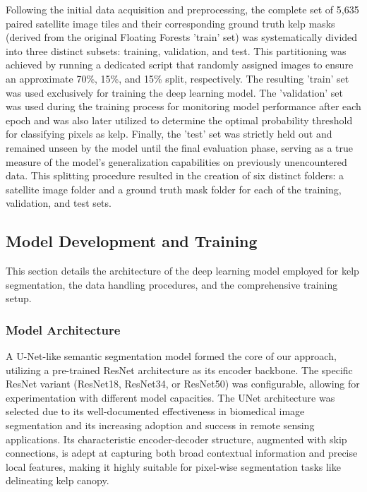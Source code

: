 \documentclass{article}
\begin{document}
Following the initial data acquisition and preprocessing, the complete set of 5,635 paired satellite image tiles and their corresponding ground truth kelp masks (derived from the original Floating Forests 'train' set) was systematically divided into three distinct subsets: training, validation, and test. This partitioning was achieved by running a dedicated script that randomly assigned images to ensure an approximate 70\%, 15\%, and 15\% split, respectively. The resulting 'train' set was used exclusively for training the deep learning model. The 'validation' set was used during the training process for monitoring model performance after each epoch and was also later utilized to determine the optimal probability threshold for classifying pixels as kelp. Finally, the 'test' set was strictly held out and remained unseen by the model until the final evaluation phase, serving as a true measure of the model's generalization capabilities on previously unencountered data. This splitting procedure resulted in the creation of six distinct folders: a satellite image folder and a ground truth mask folder for each of the training, validation, and test sets.

\subsection{Model Development and Training}

This section details the architecture of the deep learning model employed for kelp segmentation, the data handling procedures, and the comprehensive training setup.

\subsubsection{Model Architecture}

A U-Net-like semantic segmentation model formed the core of our approach, utilizing a pre-trained ResNet architecture as its encoder backbone. The specific ResNet variant (ResNet18, ResNet34, or ResNet50) was configurable, allowing for experimentation with different model capacities. The UNet architecture was selected due to its well-documented effectiveness in biomedical image segmentation and its increasing adoption and success in remote sensing applications. Its characteristic encoder-decoder structure, augmented with skip connections, is adept at capturing both broad contextual information and precise local features, making it highly suitable for pixel-wise segmentation tasks like delineating kelp canopy. 
\end{document}
